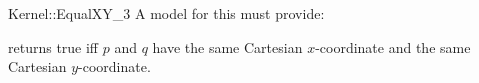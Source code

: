 \begin{ccRefFunctionObjectConcept}{Kernel::EqualXY_3}
A model for this must provide:


{returns true iff $p$ and $q$ have the same Cartesian $x$-coordinate
and the same Cartesian $y$-coordinate.}

\ccSeeAlso
{}\\

\end{ccRefFunctionObjectConcept}
